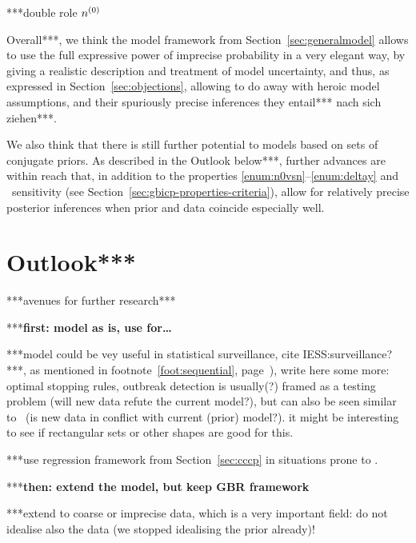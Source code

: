 ***double role $n^{(0)}$



Overall***, we think the model framework from Section~\ref{sec:generalmodel}
allows to use the full expressive power of imprecise probability %
in a very elegant way, by giving a realistic description and treatment
of model uncertainty, and thus, as expressed in Section~\ref{sec:objections},
allowing to do away with heroic model assumptions, and their spuriously precise inferences they entail*** nach sich ziehen***.

We also think that there is still further potential to models based on sets of conjugate priors.
As described in the Outlook below***,
further advances are within reach 
that, in addition to the properties \ref{enum:n0vsn}--\ref{enum:deltay} and \pdc\ sensitivity
(see Section~\ref{sec:gbicp-properties-criteria}),
allow for relatively precise posterior inferences when prior and data coincide especially well.



\section{Outlook***}
\label{sec:concluding-outlook}

***avenues for further research***

***\textbf{first: model as is, use for\dots }

***model could be vey useful in statistical surveillance, cite IESS:surveillance?***,
as mentioned in footnote~\ref{foot:sequential}, page~\pageref{foot:sequential}),
write here some more: optimal stopping rules, outbreak detection is usually(?)
framed as a testing problem (will new data refute the current model?),
but can also be seen similar to \pdc\ (is new data in conflict with current (prior) model?).
it might be interesting to see if rectangular sets or other shapes are good for this.  

***use regression framework from Section~\ref{sec:cccp} in situations prone to \pdc.


***\textbf{then: extend the model, but keep GBR framework}

***extend to coarse or imprecise data, which is a very important field:
do not idealise also the data (we stopped idealising the prior already)!

